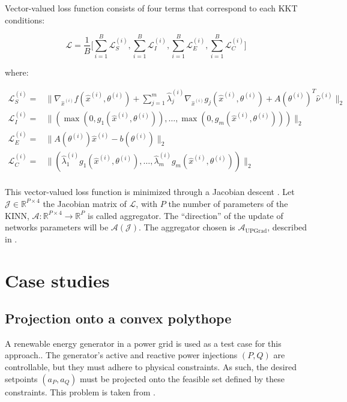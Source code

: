 \documentclass[
]{article}
\begin{document}
Vector-valued loss function consists of four terms that correspond to
each KKT conditions:

\begin{equation}
\mathcal{L} = \frac{1}{B}\biggr[\sum_{i=1}^B\mathcal{L}_{S}^{(i)}, \sum_{i=1}^B\mathcal{L}_{I}^{(i)}, \sum_{i=1}^B\mathcal{L}_{E}^{(i)}, \sum_{i=1}^B\mathcal{L}_{C}^{(i)}\biggr] 
\end{equation}

where:

\begin{align}
    \mathcal{L}_{S}^{(i)} =& \|\nabla_{\hat{x}^{(i)}} f(\hat{x}^{(i)}, \theta^{(i)}) + \sum\nolimits_{j=1}^m \hat{\lambda}^{(i)}_j\nabla_{\hat{x}^{(i)}} g_j(\hat{x}^{(i)}, \theta^{(i)}) + A(\theta^{(i)})^T\hat{\nu}^{(i)}\|_2\\ 
    \mathcal{L}_{I}^{(i)}  =& \|(\max(0, g_1(\hat{x}^{(i)}, \theta^{(i)})),\dots,\max(0, g_m(\hat{x}^{(i)}, \theta^{(i)})))\|_2\\
    \mathcal{L}_{E}^{(i)} =& \|A(\theta^{(i)}) \hat{x}^{(i)} - b(\theta^{(i)})\|_2\\
    \mathcal{L}_{C}^{(i)}  =& \|(\hat{\lambda}_1^{(i)} g_1(\hat{x}^{(i)}, \theta^{(i)}),\dots,\hat{\lambda}_m^{(i)} g_m(\hat{x}^{(i)}, \theta^{(i)}))\|_2\\
\end{align}

This vector-valued loss function is minimized through a Jacobian descent
\citep{quintonJacobianDescentMultiObjective2024a}. Let
\(\mathcal{J} \in \mathbb{R}^{P\times4}\) the Jacobian matrix of
\(\mathcal{L}\), with \(P\) the number of parameters of the KINN,
\(\mathcal{A}: \mathbb{R}^{P\times4} \to \mathbb{R}^{P}\) is called
aggregator. The ``direction'' of the update of networks parameters will
be \(\mathcal{A}(\mathcal{J})\). The aggregator chosen is
\(\mathcal{A}_{\mathrm{UPGrad}}\), described in
\citep{quintonJacobianDescentMultiObjective2024a}.

\section{Case studies}\label{case-studies}

\subsection{Projection onto a convex
polythope}\label{projection-onto-a-convex-polythope}

A renewable energy generator in a power grid is used as a test case for
this approach.. The generator's active and reactive power injections
\((P,Q)\) are controllable, but they must adhere to physical
constraints. As such, the desired setpoints \((a_P, a_Q)\) must be
projected onto the feasible set defined by these constraints. This
problem is taken from \citep{henryGymANMReinforcementLearning2021}.
\end{document}
